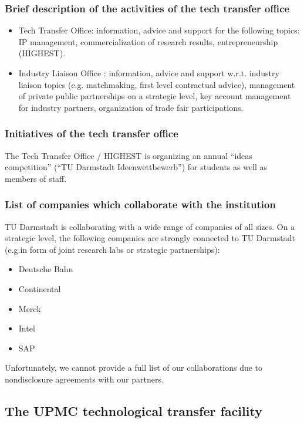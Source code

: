 \documentclass[12pt,a4paper,twoside]{article}
\begin{document}
\subsubsection{Brief description of the activities of the tech transfer office}
\begin{itemize}
\item Tech Transfer Office: information, advice and support for the following topics: IP management, commercialization of research results, entrepreneurship (HIGHEST).
\item Industry Liaison Office : information, advice and support w.r.t. industry liaison topics (e.g. matchmaking, first level contractual advice), management of private public partnerships on a strategic level, key account management for industry partners, organization of trade fair participations.
\end{itemize}

\subsubsection{Initiatives of the tech transfer office}
The Tech Transfer Office / HIGHEST is organizing an annual “ideas competition” (“TU Darmstadt Ideenwettbewerb”) for students as well as members of staff.

\subsubsection{List of companies which collaborate with the institution}
TU Darmstadt is collaborating with a wide range of companies of all sizes. On a strategic level, the following companies are strongly connected to TU Darmstadt (e.g.in form of joint research labs or strategic partnerships):
\begin{itemize}
\item Deutsche Bahn
\item Continental
\item Merck
\item Intel
\item SAP
\end{itemize}
Unfortunately, we cannot provide a full list of our collaborations due to nondisclosure agreements with our partners.


\subsection{The UPMC technological transfer facility}
\end{document}
